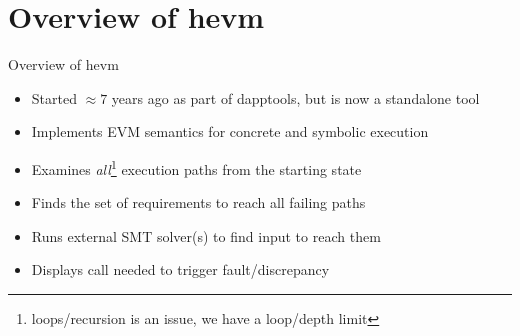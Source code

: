 \documentclass[aspectratio=169]{beamer}
\begin{document}
\section{Overview of hevm}
\begin{frame}{Overview of hevm}
\begin{itemize}
\item Started $\approx7$ years ago as part of dapptools, but is now a standalone tool
\item Implements EVM semantics for concrete and symbolic execution
\item Examines \emph{all}\footnote{loops/recursion is an issue, we have a
    loop/depth limit} execution paths from the starting state
\item Finds the set of requirements to reach all failing paths
\item Runs external SMT solver(s) to find input to reach them
\item Displays call needed to trigger fault/discrepancy
\end{itemize}
\end{frame}



%
%
%



%
%
\end{document}
